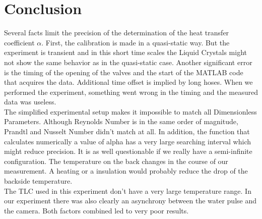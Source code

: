 \chapter{Conclusion}\label{sec:conclusion}




Several facts limit the precision of the determination of the heat transfer coefficient $\alpha$. First, the calibration is made in a quasi-static way. But the experiment is transient and in this short time scales the Liquid Crystals might not show the same behavior as in the quasi-static case. Another significant error is the timing of the opening of the valves and the start of the MATLAB code that acquires the data. Additional time offset is implied by long hoses. When we performed the experiment, something went wrong in the timing and the measured data was useless.\\

The simplified experimental setup makes it impossible to match all Dimensionless Parameters. Although Reynolds Number is in the same order  of magnitude, Prandtl and Nusselt Number didn't match at all. In addition, the function that calculates numerically a value of alpha has a very large searching interval which might reduce precision. It is as well questionable if we really have a semi-infinite configuration. The temperature on the back changes in the course of our measurement. A heating or a insulation would probably reduce the drop of the backside temperature.\\

The TLC used in this experiment don't have a very large temperature range. In our experiment there was also clearly an asynchrony between the water pulse and the camera. Both factors combined led to very poor results.


